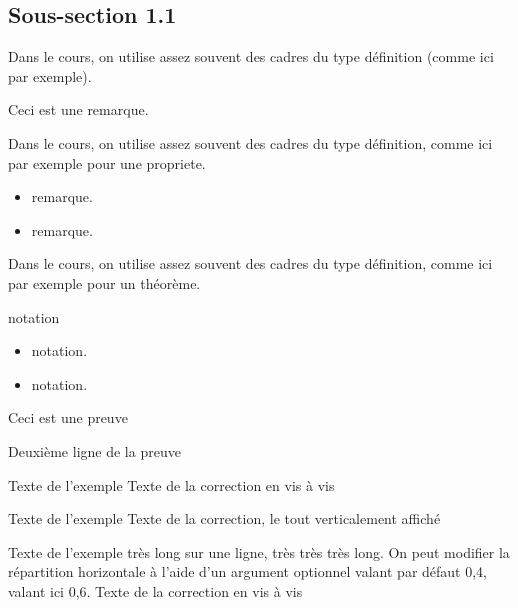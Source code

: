 \documentclass[nocrop]{sesamanuel}
\begin{document}
\subsection{Sous-section 1.1}
\begin{definition}
  Dans le cours, on utilise assez souvent des cadres du type
  définition (comme ici par exemple).
\end{definition}
\begin{remarque}
  Ceci est une remarque.
\end{remarque}
\begin{propriete}
  Dans le cours, on utilise assez souvent des cadres du type
  définition, comme ici par exemple pour une propriete.
\end{propriete}
\begin{remarques}
  \begin{itemize}
    \item remarque.
    \item remarque.
  \end{itemize}
\end{remarques}
\begin{theoreme}
  Dans le cours, on utilise assez souvent des cadres du type
  définition, comme ici par exemple pour un théorème.
\end{theoreme}
\begin{notation}
  notation
\end{notation}
\begin{notations}
  \begin{itemize}
    \item notation.
    \item notation.
  \end{itemize}
\end{notations}
\begin{preuve}
  Ceci est une preuve\par Deuxième ligne de la preuve
\end{preuve}
\begin{exemple}
  Texte de l’exemple
  \correction
  Texte de la correction en vis à vis
\end{exemple}

\begin{exemple*1}
  Texte de l’exemple
  \correction
  Texte de la correction, le tout verticalement affiché
\end{exemple*1}

\begin{exemple}[0.6]
  Texte de l’exemple très long sur une ligne, très très très long.
  On peut modifier la répartition horizontale  à l'aide d'un argument optionnel valant par défaut 0,4, valant ici 0,6.
  \correction
  Texte de la correction en vis à vis
\end{exemple}
\end{document}
